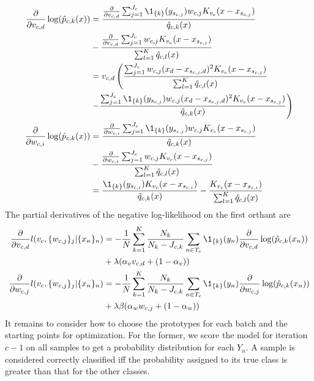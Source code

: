 \begin{align}
\frac{\partial}{\partial v_{c,d}}\log(\hat{p}_{c,k}(x))&
=\frac{\frac{\partial}{\partial v_{c,d}}
\sum_{j=1}^{J_c}\1_{\{k\}}(y_{s_{c,j}})w_{c,j}K_{v_c}(x-x_{s_{c,j}})}
{\hat{q}_{c,k}(x)}
\label{eq_p_partial_v}\\
&-\frac{\frac{\partial}{\partial v_{c,d}}
\sum_{j=1}^{J_c}w_{c,j}K_{v_c}(x-x_{s_{c,j}})}
{\sum_{l=1}^K\hat{q}_{c,l}(x)}\notag\\
&=v_{c,d}\left(\frac{\sum_{j=1}^{J_c}w_{c,j}
(x_d-x_{s_{c,j},d})^2K_{v_c}(x-x_{s_{c,j}})}
{\sum_{l=1}^K\hat{q}_{c,l}(x)}\right.\notag\\
&\left.-\frac{\sum_{j=1}^{J_c}\1_{\{k\}}(y_{s_{c,j}})w_{c,j}
(x_d-x_{s_{c,j},d})^2K_{v_c}(x-x_{s_{c,j}})}
{\hat{q}_{c,k}(x)}\right)\notag\\
\frac{\partial}{\partial w_{c,i}}\log(\hat{p}_{c,k}(x))&
=\frac{\frac{\partial}{\partial w_{c,i}}
\sum_{j=1}^{J_c}\1_{\{k\}}(y_{s_{c,j}})w_{c,j}K_{v_c}(x-x_{s_{c,j}})}
{\hat{q}_{c,k}(x)}
\label{eq_p_partial_w}\\
&-\frac{\frac{\partial}{\partial w_{c,i}}
\sum_{j=1}^{J_c}w_{c,j}K_{v_c}(x-x_{s_{c,j}})}
{\sum_{l=1}^K\hat{q}_{c,l}(x)}\notag\\
&=\frac{\1_{\{k\}}(y_{s_{c,i}})K_{v_c}(x-x_{s_{c,i}})}
{\hat{q}_{c,k}(x)}
-\frac{K_{v_c}(x-x_{s_{c,i}})}
{\sum_{l=1}^K\hat{q}_{c,l}(x)}\notag
\end{align}
%
The partial derivatives of the negative log-likelihood on the first orthant are
%
\begin{align}
\frac{\partial}{\partial v_{c,d}}l(v_c,\{w_{c,j}\}_j|\{x_n\}_n)
&=-\frac{1}{N}\sum_{k=1}^K\frac{N_k}{N_k-J_{c,k}}\sum_{n\in T_c}
\1_{\{k\}}(y_n)\frac{\partial}{\partial v_{c,d}}\log(\hat{p}_{c,k}(x_n))
\label{eq_l_partial_v}\\
&+\lambda(\alpha_v v_{c,d}+(1-\alpha_v))\notag\\
\frac{\partial}{\partial w_{c,j}}l(v_c,\{w_{c,j}\}_j|\{x_n\}_n)
&=-\frac{1}{N}\sum_{k=1}^K\frac{N_k}{N_k-J_{c,k}}\sum_{n\in T_c}
\1_{\{k\}}(y_n)\frac{\partial}{\partial w_{c,j}}\log(\hat{p}_{c,k}(x_n))
\notag\\
&+\lambda\beta(\alpha_w w_{c,j}+(1-\alpha_w))\notag
\end{align}
%
It remains to consider how to choose the prototypes for each batch and the starting points for optimization.
For the former, we score the model for iteration $c-1$ on all samples to get a probability distribution for each $Y_n$.
A sample is considered correctly classified iff the probability assigned to its true class is greater than that for the other classes.
